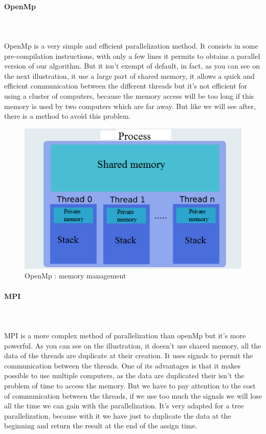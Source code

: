 \paragraph{OpenMp}\mbox{}\\\mbox{}\\
	OpenMp is a very simple and efficient parallelization method. It consists in some pre-compilation instructions, with only a few lines it permits to obtains a parallel version of our algorithm. But it isn't exempt of default, in fact, as you can see on the next illustration, it use a large part of shared memory, it allows a quick and efficient communication between the different threads but it's not efficient for using a cluster of computers, because the memory access will be too long if this memory is used by two computers which are far away. But like we will see after, there is a method to avoid this problem.
\begin{figure}[!h] 
\centerline{\includegraphics[scale=0.50]{3_Software_considered/MultithreadingMP_boost_Visual_MPI_5000_Zotero_Project_Baptiste/OpenMP}}
   \caption{\label{étiquette} OpenMp : memory management}
\end{figure}

\paragraph{MPI}\mbox{}\\\mbox{}\\
	MPI is a more complex method of parallelization than openMp but it's more powerful. As you can see on the illustration, it doesn't use shared memory, all the data of the threads are duplicate at their creation. It uses signals to permit the communication between the threads. One of its advantages is that it makes possible to use multiple computers, as the data are duplicated their isn't the problem of time to access the memory. But we have to pay attention to the cost of communication between the threads, if we use too much the signals we will lose all the time we can gain with the parallelization. It's very adapted for a tree parallelization, because with it we have just to duplicate the data at the beginning and return the result at the end of the assign time.


